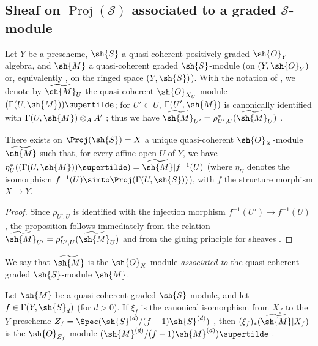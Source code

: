 \subsection{Sheaf on $\operatorname{Proj}(\mathcal{S})$ associated to a graded $\mathcal{S}$-module}
\label{subsection:II.3.2}

\begin{env}[3.2.1]
\label{II.3.2.1}
Let $Y$ be a prescheme, $\sh{S}$ a quasi-coherent positively graded $\sh{O}_Y$-algebra, and $\sh{M}$ a quasi-coherent graded $\sh{S}$-module (on $(Y,\sh{O}_Y)$ or, equivalently , on the ringed space $(Y,\sh{S})$).
With the notation of , we denote by $\widetilde{\sh{M}}_U$ the quasi-coherent $\sh{O}_{X_U}$-module $(\Gamma(U,\sh{M}))\supertilde$;
for $U'\subset U$, $\Gamma(U',\sh{M})$ is canonically identified with $\Gamma(U,\sh{M})\otimes_A A'$ ;
thus we have $\widetilde{\sh{M}}_{U'}=\rho_{U',U}^*(\widetilde{\sh{M}}_U)$ .
\end{env}

\begin{proposition}[3.2.2]
\label{II.3.2.2}
There exists on $\Proj(\sh{S})=X$ a unique quasi-coherent $\sh{O}_X$-module $\widetilde{\sh{M}}$ such that, for every affine open $U$ of $Y$, we have $\eta_U^*((\Gamma(U,\sh{M}))\supertilde)=\widetilde{\sh{M}}|f^{-1}(U)$ (where $\eta_U$ denotes the isomorphism $f^{-1}(U)\simto\Proj(\Gamma(U,\sh{S}))$), with $f$ the structure morphism $X\to Y$.
\end{proposition}

\begin{proof}
Since $\rho_{U',U}$ is identified with the injection morphism $f^{-1}(U')\to f^{-1}(U)$ , the proposition follows immediately from the relation $\widetilde{\sh{M}}_{U'}=\rho_{U',U}^*(\widetilde{\sh{M}}_U)$ and from the gluing principle for sheaves .
\end{proof}

We say that $\widetilde{\sh{M}}$ is the $\sh{O}_X$-module \emph{associated to} the quasi-coherent graded $\sh{S}$-module $\sh{M}$.

\begin{proposition}[3.2.3]
\label{II.3.2.3}
Let $\sh{M}$ be a quasi-coherent graded $\sh{S}$-module, and let $f\in\Gamma(Y,\sh{S}_d)$ (for $d>0$).
If $\xi_f$ is the canonical isomorphism from $X_f$ to the $Y$-prescheme $Z_f=\Spec(\sh{S}^{(d)}/(f-1)\sh{S}^{(d)})$ , then $(\xi_f)_*(\widetilde{\sh{M}}|X_f)$ is the $\sh{O}_{Z_f}$-module $(\sh{M}^{(d)}/(f-1)\sh{M}^{(d)})\supertilde$ .
\end{proposition}


